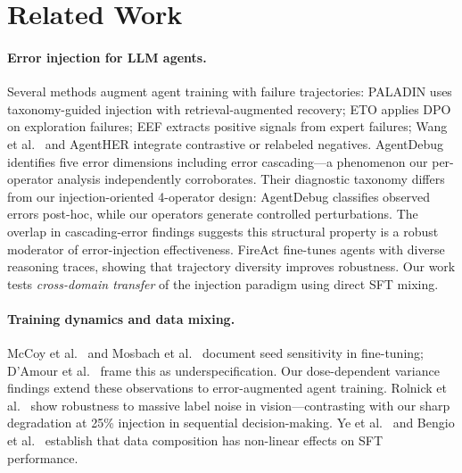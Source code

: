 \section{Related Work}
\label{sec:related_work}

\paragraph{Error injection for LLM agents.}
Several methods augment agent training with failure trajectories: PALADIN \cite{paladin2025} uses taxonomy-guided injection with retrieval-augmented recovery; ETO \cite{song2024eto} applies DPO on exploration failures; EEF \cite{eef2025} extracts positive signals from expert failures; Wang et al.\  and AgentHER \cite{agentHER2025} integrate contrastive or relabeled negatives. AgentDebug \cite{agentdebug2025} identifies five error dimensions including error cascading---a phenomenon our per-operator analysis independently corroborates. Their diagnostic taxonomy differs from our injection-oriented 4-operator design: AgentDebug classifies observed errors post-hoc, while our operators generate controlled perturbations. The overlap in cascading-error findings suggests this structural property is a robust moderator of error-injection effectiveness. FireAct \cite{chen2023fireact} fine-tunes agents with diverse reasoning traces, showing that trajectory diversity improves robustness. Our work tests \emph{cross-domain transfer} of the injection paradigm using direct SFT mixing.

\paragraph{Training dynamics and data mixing.}
McCoy et al.\  and Mosbach et al.\  document seed sensitivity in fine-tuning; D'Amour et al.\  frame this as underspecification. Our dose-dependent variance findings extend these observations to error-augmented agent training. Rolnick et al.\  show robustness to massive label noise in vision---contrasting with our sharp degradation at 25\% injection in sequential decision-making. Ye et al.\  and Bengio et al.\  establish that data composition has non-linear effects on SFT performance.

